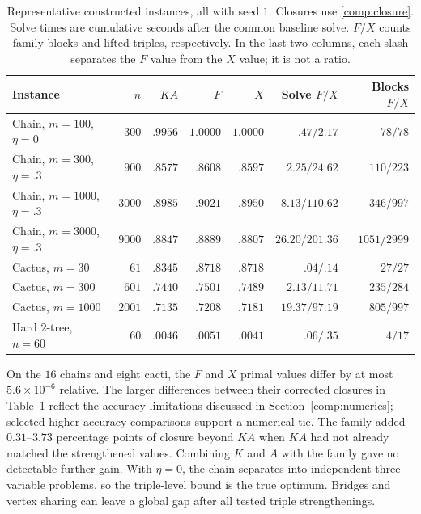 \begin{table}[htbp]
\centering
\small
\caption{Representative constructed instances, all with seed $1$. Closures use
\eqref{comp:closure}. Solve times are cumulative seconds
after the common baseline solve. $F/X$ counts family blocks and lifted
triples, respectively. In the last two columns, each slash separates
the $F$ value from the $X$ value; it is not a ratio.}
\label{comp:constructed-table}
\begin{tabular}{lrrrrrr}
\toprule
Instance & $n$ & $KA$ & $F$ & $X$ &
Solve $F/X$ & Blocks $F/X$\\
\midrule
Chain, $m=100$, $\eta=0$ & $300$ & $.9956$ & $1.0000$ & $1.0000$
 & $.47/2.17$ & $78/78$\\
Chain, $m=300$, $\eta=.3$ & $900$ & $.8577$ & $.8608$ & $.8597$
 & $2.25/24.62$ & $110/223$\\
Chain, $m=1000$, $\eta=.3$ & $3000$ & $.8985$ & $.9021$ & $.8950$
 & $8.13/110.62$ & $346/997$\\
Chain, $m=3000$, $\eta=.3$ & $9000$ & $.8847$ & $.8889$ & $.8807$
 & $26.20/201.36$ & $1051/2999$\\
Cactus, $m=30$ & $61$ & $.8345$ & $.8718$ & $.8718$
 & $.04/.14$ & $27/27$\\
Cactus, $m=300$ & $601$ & $.7440$ & $.7501$ & $.7489$
 & $2.13/11.71$ & $235/284$\\
Cactus, $m=1000$ & $2001$ & $.7135$ & $.7208$ & $.7181$
 & $19.37/97.19$ & $805/997$\\
Hard $2$-tree, $n=60$ & $60$ & $.0046$ & $.0051$ & $.0041$
 & $.06/.35$ & $4/17$\\
\bottomrule
\end{tabular}
\end{table}

On the $16$ chains and eight cacti, the $F$ and $X$ primal values differ
by at most $5.6\times10^{-6}$ relative. The larger differences between
their corrected closures in Table~\ref{comp:constructed-table} reflect
the accuracy limitations discussed in Section~\ref{comp:numerics};
selected higher-accuracy comparisons support a numerical tie.
The family added
$0.31$--$3.73$ percentage points of closure beyond $KA$ when $KA$
had not already matched the strengthened values. Combining $K$ and $A$ with the
family gave no detectable further gain. With $\eta=0$, the chain
separates into independent three-variable problems, so the triple-level
bound is the true optimum. Bridges and vertex sharing can leave a
global gap after all tested triple strengthenings.


